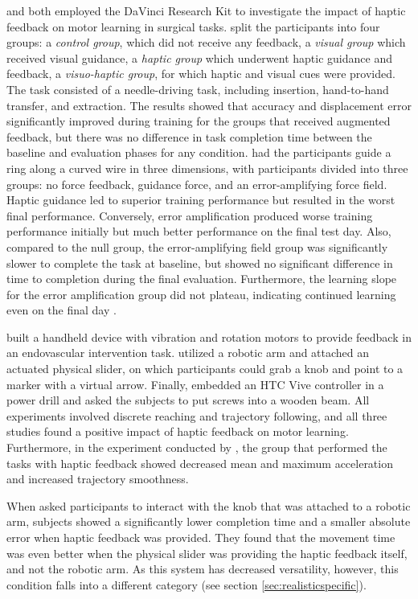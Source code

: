 \cite{Caccianiga2021} and \cite{Oquendo2024} both employed the DaVinci Research Kit to investigate the impact of haptic feedback on motor learning in surgical tasks. \cite{Caccianiga2021} split the participants into four groups: a \textit{control group}, which did not receive any feedback, a \textit{visual group} which received visual guidance, a \textit{haptic group} which underwent haptic guidance and feedback, a \textit{visuo-haptic group}, for which haptic and visual cues were provided. The task consisted of a needle-driving task, including insertion, hand-to-hand transfer, and extraction. The results showed that accuracy and displacement error significantly improved during training for the groups that received augmented feedback, but there was no difference in task completion time between the baseline and evaluation phases for any condition. \cite{Oquendo2024} had the participants guide a ring along a curved wire in three dimensions, with participants divided into three groups: no force feedback, guidance force, and an error-amplifying force field. Haptic guidance led to superior training performance but resulted in the worst final performance. Conversely, error amplification produced worse training performance initially but much better performance on the final test day. Also, compared to the null group, the error-amplifying field group was significantly slower to complete the task at baseline, but showed no significant difference in time to completion during the final evaluation. Furthermore, the learning slope for the error amplification group did not plateau, indicating continued learning even on the final day \cite{Oquendo2024}.

\cite{Chi2017} built a handheld device with vibration and rotation motors to provide feedback in an endovascular intervention task. \cite{Dai2023} utilized a robotic arm and attached an actuated physical slider, on which participants could grab a knob and point to a marker with a virtual arrow. Finally, \cite{Yang2023} embedded an HTC Vive controller in a power drill and asked the subjects to put screws into a wooden beam. All experiments involved discrete reaching and trajectory following, and all three studies found a positive impact of haptic feedback on motor learning. 
Furthermore, in the experiment conducted by \cite{Chi2017}, the group that performed the tasks with haptic feedback showed decreased mean and maximum acceleration and increased trajectory smoothness. 

When \cite{Dai2023} asked participants to interact with the knob that was attached to a robotic arm, subjects showed a significantly lower completion time and a smaller absolute error when haptic feedback was provided. They found that the movement time was even better when the physical slider was providing the haptic feedback itself, and not the robotic arm. As this system has decreased versatility, however, this condition falls into a different category (see section \ref{sec:realisticspecific}). 

